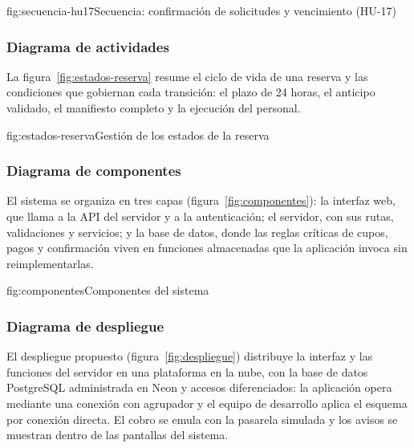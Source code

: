 \begin{figuraapa}{fig:secuencia-hu17}{Secuencia: confirmación de solicitudes y vencimiento (HU-17)}
\end{figuraapa}

\subsubsection{Diagrama de actividades}

La figura~\ref{fig:estados-reserva} resume el ciclo de vida de una reserva y
las condiciones que gobiernan cada transición: el plazo de 24 horas, el
anticipo validado, el manifiesto completo y la ejecución del personal.

\begin{figuraapa}{fig:estados-reserva}{Gestión de los estados de la reserva}
\end{figuraapa}

\subsubsection{Diagrama de componentes}

El sistema se organiza en tres capas (figura~\ref{fig:componentes}): la
interfaz web, que llama a la API del servidor y a la autenticación; el
servidor, con sus rutas, validaciones y servicios; y la base de datos, donde
las reglas críticas de cupos, pagos y confirmación viven en funciones
almacenadas que la aplicación invoca sin reimplementarlas.

\begin{figuraapa}{fig:componentes}{Componentes del sistema}
\end{figuraapa}

\subsubsection{Diagrama de despliegue}

El despliegue propuesto (figura~\ref{fig:despliegue}) distribuye la interfaz
y las funciones del servidor en una plataforma en la nube, con la base de
datos PostgreSQL administrada en Neon y accesos diferenciados: la aplicación
opera mediante una conexión con agrupador y el equipo de desarrollo aplica el
esquema por conexión directa. El cobro se emula con la pasarela simulada y
los avisos se muestran dentro de las pantallas del sistema.

